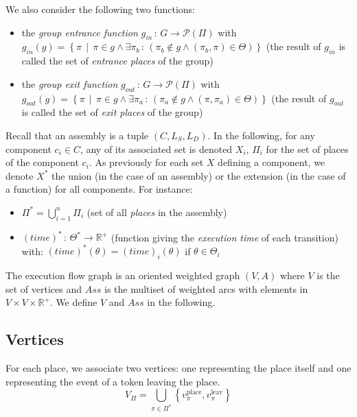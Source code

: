 We also consider the following two functions:
\begin{itemize}
\item the \emph{group entrance function} $g_{in}\,:\,G\rightarrow\mathcal{P}\left(\Pi\right)$ with\\
$g_{in}(g)=\left\{ \pi\,\mid\,\pi\in g\land\exists\pi_{b}\,:\,\left(\pi_{b}\not\in g\land\left(\pi_{b},\pi\right)\in\Theta\right)\right\} $
(the result of $g_{in}$ is called the set of \emph{entrance places}
of the group)
\item the \emph{group exit function} $g_{out}\,:\,G\rightarrow\mathcal{P}\left(\Pi\right)$ with\\
$g_{out}(g)=\left\{ \pi\,\mid\,\pi\in g\land\exists\pi_{a}\,:\,\left(\pi_{a}\not\in g\land\left(\pi,\pi_{a}\right)\in\Theta\right)\right\} $
(the result of $g_{out}$ is called the set of \emph{exit places}
of the group)
\end{itemize}

Recall that an assembly is a tuple $\left(C,L_S,L_D\right)$. In
the following, for any component $c_i \in C$, any of its
associated set is denoted $X_i$, \eg $\Pi_i$ for the set of places of
the component $c_i$.
As previously for each set $X$ defining a component, we denote $X^*$ the
union (in the case of an assembly) or the extension (in the case of
a function) for all components. For instance:
\begin{itemize}
\item $\Pi^*=\bigcup_{i=1}^{n}\Pi_{i}$ (set of all \emph{places} in
the assembly)
\item $\left(time\right)^*\,:\,\Theta^*\rightarrow\mathbb{R}^{+}$
(function giving the \emph{execution time} of each transition) with:
$\left(time\right)^*\left(\theta\right)=\left(time\right)_{i}\left(\theta\right)$
if $\theta\in\Theta_{i}$ 
\end{itemize}
The execution flow graph is an oriented weighted graph \emph{$\left(V,A\right)$}
where $V$ is the set of vertices and $Ass$ is the multiset of weighted
arcs with elements in $V\times V\times\mathbb{R}^{+}$. We define
$V$ and $Ass$ in the following.

\subsection{Vertices}

For each place, we associate two vertices: one representing the place
itself and one representing the event of a token leaving the place.
\[
V_{\Pi}=\bigcup_{\pi\in\Pi^*}\left\{ v_\pi^\text{place},v_\pi^\text{leav}\right\} 
\]

